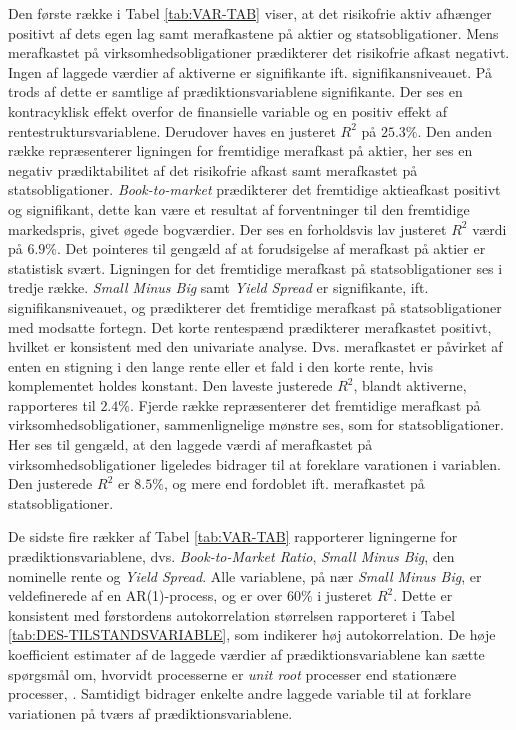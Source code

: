 \documentclass[
  a4paper,
  oneside]{memoir}
\begin{document}
Den første række i Tabel \ref{tab:VAR-TAB} viser, at det risikofrie aktiv afhænger positivt af dets egen lag samt merafkastene på aktier og statsobligationer. Mens merafkastet på virksomhedsobligationer prædikterer det risikofrie afkast negativt. Ingen af laggede værdier af aktiverne er signifikante ift. signifikansniveauet. På trods af dette er samtlige af prædiktionsvariablene signifikante. Der ses en kontracyklisk effekt overfor de finansielle variable og en positiv effekt af rentestruktursvariablene. Derudover haves en justeret \(R^2\) på \(25.3\%\). Den anden række repræsenterer ligningen for fremtidige merafkast på aktier, her ses en negativ prædiktabilitet af det risikofrie afkast samt merafkastet på statsobligationer. \emph{Book-to-market} prædikterer det fremtidige aktieafkast positivt og signifikant, dette kan være et resultat af forventninger til den fremtidige markedspris, givet øgede bogværdier. Der ses en forholdsvis lav justeret \(R^2\) værdi på \(6.9\%\). Det pointeres til gengæld af \citep{CampVicCha2003} at forudsigelse af merafkast på aktier er statistisk svært. Ligningen for det fremtidige merafkast på statsobligationer ses i tredje række. \emph{Small Minus Big} samt \emph{Yield Spread} er signifikante, ift. signifikansniveauet, og prædikterer det fremtidige merafkast på statsobligationer med modsatte fortegn. Det korte rentespænd prædikterer merafkastet positivt, hvilket er konsistent med den univariate analyse. Dvs. merafkastet er påvirket af enten en stigning i den lange rente eller et fald i den korte rente, hvis komplementet holdes konstant. Den laveste justerede \(R^2\), blandt aktiverne, rapporteres til \(2.4\%\). Fjerde række repræsenterer det fremtidige merafkast på virksomhedsobligationer, sammenlignelige mønstre ses, som for statsobligationer. Her ses til gengæld, at den laggede værdi af merafkastet på virksomhedsobligationer ligeledes bidrager til at foreklare varationen i variablen. Den justerede \(R^2\) er \(8.5\%\), og mere end fordoblet ift. merafkastet på statsobligationer.

De sidste fire rækker af Tabel \ref{tab:VAR-TAB} rapporterer ligningerne for prædiktionsvariablene, dvs. \emph{Book-to-Market Ratio}, \emph{Small Minus Big}, den nominelle rente og \emph{Yield Spread}. Alle variablene, på nær \emph{Small Minus Big}, er veldefinerede af en AR(1)-process, og er over \(60\%\) i justeret \(R^2\). Dette er konsistent med førstordens autokorrelation størrelsen rapporteret i Tabel \ref{tab:DES-TILSTANDSVARIABLE}, som indikerer høj autokorrelation. De høje koefficient estimater af de laggede værdier af prædiktionsvariablene kan sætte spørgsmål om, hvorvidt processerne er \emph{unit root} processer end stationære processer, \citep{JurVic2011}. Samtidigt bidrager enkelte andre laggede variable til at forklare variationen på tværs af prædiktionsvariablene.
\end{document}

